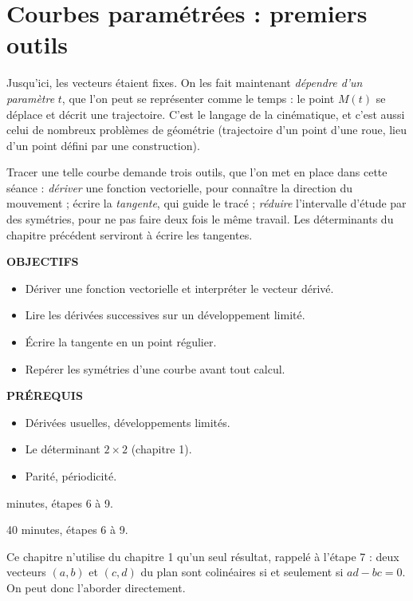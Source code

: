 \documentclass[a4paper,11pt]{article}
\numberwithin{equation}{section}
\numberwithin{figure}{section}
\numberwithin{table}{section}
\theoremstyle{enonce}
\theoremstyle{exemple}
\theoremstyle{remarque}
\newcommand{\ouverture}[3]{%
  \begin{tcolorbox}[enhanced,colback=Fond,colframe=Fond,arc=0pt,boxrule=0pt,left=12pt,right=12pt,top=10pt,bottom=10pt,
     before skip=1.2em,after skip=1.6em]
  \begin{minipage}[t]{0.56\linewidth}
  {\sffamily\bfseries\small\color{Bleu}OBJECTIFS}\par\vspace{0.3em}\small #1
  \end{minipage}\hfill
  \begin{minipage}[t]{0.38\linewidth}
  {\sffamily\bfseries\small\color{Bleu}PRÉREQUIS}\par\vspace{0.3em}\small #2
  \ifx\relax#3\relax\else\par\vspace{0.6em}{\sffamily\bfseries\small\color{Bleu}DURÉE}\par\vspace{0.2em}\small #3\fi
  \end{minipage}
  \end{tcolorbox}}
\begin{document}
\clearpage
\section{Courbes paramétrées : premiers outils}

Jusqu'ici, les vecteurs étaient fixes. On les fait maintenant \emph{dépendre d'un paramètre} $t$, que l'on peut se
représenter comme le temps : le point $M(t)$ se déplace et décrit une trajectoire. C'est le langage de la cinématique,
et c'est aussi celui de nombreux problèmes de géométrie (trajectoire d'un point d'une roue, lieu d'un point défini par
une construction).

Tracer une telle courbe demande trois outils, que l'on met en place dans cette séance : \emph{dériver} une fonction
vectorielle, pour connaître la direction du mouvement ; écrire la \emph{tangente}, qui guide le tracé ; \emph{réduire}
l'intervalle d'étude par des symétries, pour ne pas faire deux fois le même travail. Les déterminants du chapitre
précédent serviront à écrire les tangentes.

\ouverture{%
\begin{itemize}
\item Dériver une fonction vectorielle et interpréter le vecteur dérivé.
\item Lire les dérivées successives sur un développement limité.
\item Écrire la tangente en un point régulier.
\item Repérer les symétries d'une courbe avant tout calcul.
\end{itemize}}{%
\begin{itemize}
\item Dérivées usuelles, développements limités.
\item Le déterminant $2\times2$ (chapitre 1).
\item Parité, périodicité.
\end{itemize}}{40 minutes, étapes 6 à 9.}

\begin{commencer}
Ce chapitre n'utilise du chapitre 1 qu'un seul résultat, rappelé à l'étape 7 : deux vecteurs $(a,b)$ et $(c,d)$ du plan
sont colinéaires si et seulement si $ad-bc=0$. On peut donc l'aborder directement.
\end{commencer}
\end{document}
